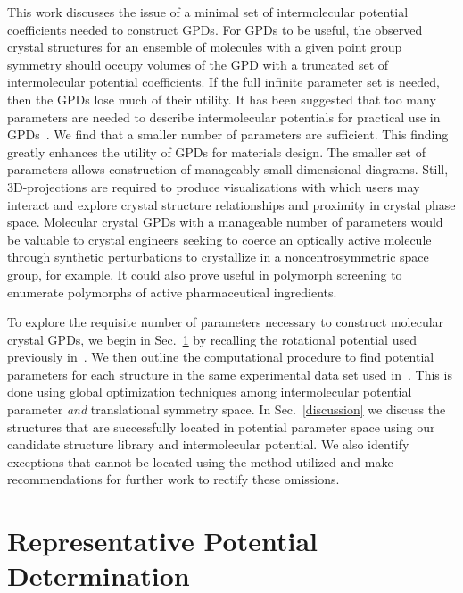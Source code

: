 \documentclass[preprint]{iucr}              %
\begin{document}
This work discusses the issue of a minimal set of intermolecular potential
coefficients needed to construct GPDs.  For GPDs to be useful, the observed
crystal structures for an ensemble of molecules with a given point group
symmetry should occupy volumes of the GPD with a truncated set of intermolecular
potential coefficients.  If the full infinite parameter set is needed, then the
GPDs lose much of their utility.  It has been suggested that too many parameters
are needed to describe intermolecular potentials for practical use in
GPDs~\cite{Briels80}.  We find that a smaller number of parameters are
sufficient.  This finding greatly enhances the utility of GPDs for materials
design. The smaller set of parameters allows construction of manageably
small-dimensional diagrams.  Still, 3D-projections are required to produce
visualizations with which users may interact and explore crystal structure
relationships and proximity in crystal phase space.  Molecular crystal GPDs with
a manageable number of parameters would be valuable to crystal engineers seeking
to coerce an optically active molecule through synthetic perturbations to
crystallize in a noncentrosymmetric space group, for example. It could also
prove useful in polymorph screening to enumerate polymorphs of active
pharmaceutical ingredients. 

To explore the requisite number of parameters necessary to construct molecular
crystal GPDs, we begin in Sec.~\ref{method} by recalling the rotational
potential used previously in~\cite{Mettes04}.  We then outline the computational
procedure to find potential parameters for each structure in the same
experimental data set used in~\cite{McClurg09}. This is done using global
optimization techniques among intermolecular potential parameter
\emph{and} translational symmetry space. In Sec.~\ref{discussion} we discuss the
structures that are successfully located in potential parameter space using our
candidate structure library and intermolecular potential.  We also identify
exceptions that cannot be located using the method utilized and make
recommendations for further work to rectify these omissions.


\section{Representative Potential Determination}
\label{method}
\end{document}
